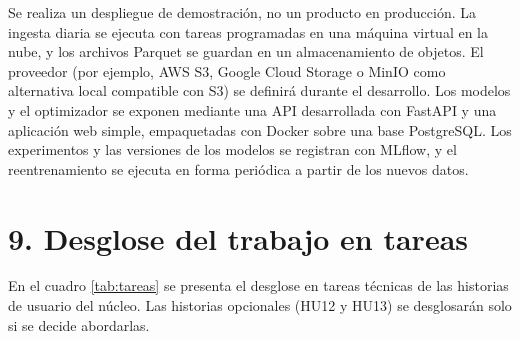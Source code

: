 \documentclass[
11pt, %
]{charter}
\begin{document}
Se realiza un despliegue de demostración, no un producto en producción. La ingesta diaria se ejecuta con tareas programadas en una máquina virtual en la nube, y los archivos Parquet se guardan en un almacenamiento de objetos. El proveedor (por ejemplo, AWS S3, Google Cloud Storage o MinIO como alternativa local compatible con S3) se definirá durante el desarrollo. Los modelos y el optimizador se exponen mediante una API desarrollada con FastAPI y una aplicación web simple, empaquetadas con Docker sobre una base PostgreSQL. Los experimentos y las versiones de los modelos se registran con MLflow, y el reentrenamiento se ejecuta en forma periódica a partir de los nuevos datos.

\section{9. Desglose del trabajo en tareas}
\label{sec:wbs}

En el cuadro \ref{tab:tareas} se presenta el desglose en tareas técnicas de las historias de usuario del núcleo. Las historias opcionales (HU12 y HU13) se desglosarán solo si se decide abordarlas.
\end{document}
